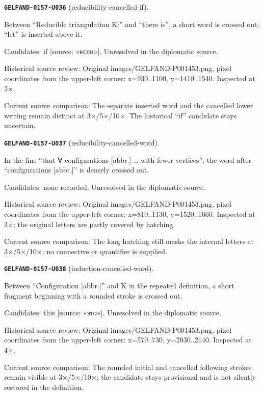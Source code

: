\par\noindent\leavevmode{}\label{GELFAND-0157-U036}\label{GELFAND-P001453:reducibility-cancelled-if}\textbf{\texttt{GELFAND-0157-U036}} (reducibility-cancelled-if).\nopagebreak[4]\par
Between “Reducible triangulation K:” and “there is”, a short word is crossed out; “let” is inserted above it.\par
Candidates: if [source: «если»]. Unresolved in the diplomatic source.\par
Historical source review: Original images/GELFAND-P001453.png, pixel coordinates from the upper-left corner: x=930..1100, y=1410..1540. Inspected at 3×.\par
Current source comparison: The separate inserted word and the cancelled lower writing remain distinct at 3×/5×/10×. The historical “if” candidate stays uncertain.\par\medskip
\par\noindent\leavevmode{}\label{GELFAND-0157-U037}\label{GELFAND-P001453:reducibility-cancelled-word}\textbf{\texttt{GELFAND-0157-U037}} (reducibility-cancelled-word).\nopagebreak[4]\par
In the line “that ∀ configurations [abbr.] … with fewer vertices”, the word after “configurations [abbr.]” is densely crossed out.\par
Candidates: none recorded. Unresolved in the diplomatic source.\par
Historical source review: Original images/GELFAND-P001453.png, pixel coordinates from the upper-left corner: x=810..1130, y=1520..1660. Inspected at 3×; the original letters are partly covered by hatching.\par
Current source comparison: The long hatching still masks the internal letters at 3×/5×/10×; no connective or quantifier is supplied.\par\medskip
\par\noindent\leavevmode{}\label{GELFAND-0157-U038}\label{GELFAND-P001453:induction-cancelled-word}\textbf{\texttt{GELFAND-0157-U038}} (induction-cancelled-word).\nopagebreak[4]\par
Between “Configuration [abbr.]” and K in the repeated definition, a short fragment beginning with a rounded stroke is crossed out.\par
Candidates: this [source: «это»]. Unresolved in the diplomatic source.\par
Historical source review: Original images/GELFAND-P001453.png, pixel coordinates from the upper-left corner: x=570..730, y=2030..2140. Inspected at 4×.\par
Current source comparison: The rounded initial and cancelled following strokes remain visible at 3×/5×/10×; the candidate stays provisional and is not silently restored in the definition.\par\medskip
